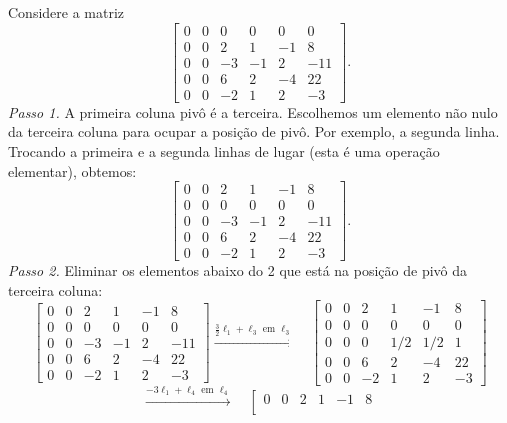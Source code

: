 \documentclass[../livro.tex]{subfiles} %
\begin{document}
\begin{example}\label{escalonada2}
Considere a matriz
\begin{equation}
\left[
\begin{array}{rrrrrr}
   0&0&0&0&0&0 \\
   0&0&2&1&-1&8\\
   0&0&-3&-1&2&-11\\
   0&0&6&2&-4&22\\
   0&0&-2&1&2&-3
\end{array}
\right].
\end{equation}
\textit{Passo 1.} A primeira coluna pivô é a terceira. Escolhemos um elemento não nulo da terceira coluna para ocupar a posição de pivô. Por exemplo, a segunda linha. Trocando a primeira e a segunda linhas de lugar (esta é uma operação elementar), obtemos:
\begin{equation}
\left[
\begin{array}{rrrrrr}
   0&0&2&1&-1&8\\
   0&0&0&0&0&0 \\
   0&0&-3&-1&2&-11\\
   0&0&6&2&-4&22\\
   0&0&-2&1&2&-3
\end{array}
\right].
\end{equation}
\textit{Passo 2.} Eliminar os elementos abaixo do 2 que está na posição de pivô da terceira coluna:
\begin{equation}
\left[
\begin{array}{rrrrrr}
   0&0&2&1&-1&8\\
   0&0&0&0&0&0 \\
   0&0&-3&-1&2&-11\\
   0&0&6&2&-4&22\\
   0&0&-2&1&2&-3
\end{array}
\right]
\xrightarrow{\frac{3}{2}\ell_1 + \ell_3 \text{ em } \ell_3} \quad
\left[
\begin{array}{cccccc}
   0&0&2&1&-1&8\\
   0&0&0&0&0&0 \\
   0&0&0&1/2&1/2&1\\
   0&0&6&2&-4&22\\
   0&0&-2&1&2&-3
\end{array}
\right]
\end{equation}
\begin{equation}
\xrightarrow{-3\ell_1 + \ell_4 \text{ em } \ell_4} \quad
\left[
\begin{array}{cccccc}
   0&0&2&1&-1&8\\

\end{array}
\end{equation}
\end{example}
\end{document}
